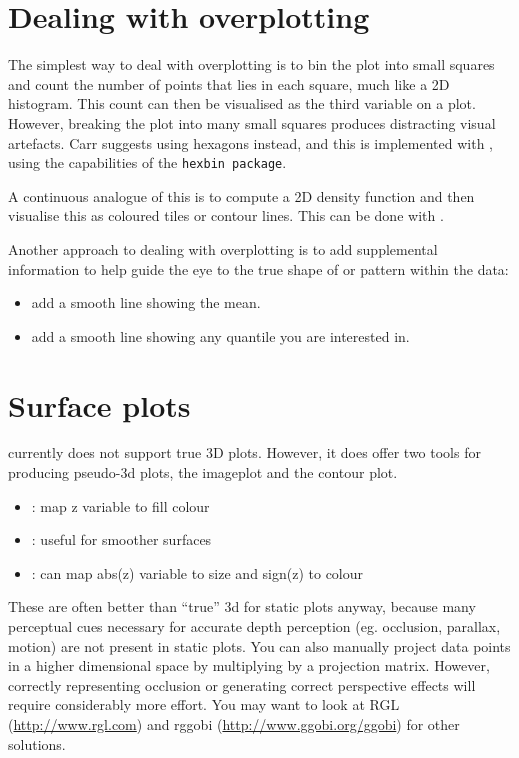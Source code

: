 \section{Dealing with overplotting}
\label{sec:overplotting}

The simplest way to deal with overplotting is to bin the plot into small squares and count the number of points that lies in each square, much like a 2D histogram.  This count can then be visualised as the third variable on a plot.  However, breaking the plot into many small squares produces distracting visual artefacts.  Carr \citep{carr:1987} suggests using hexagons instead, and this is implemented with , using the capabilities of the {\tt hexbin package}.

A continuous analogue of this is to compute a 2D density function and then visualise this as coloured tiles or contour lines.  This can be done with .

Another approach to dealing with overplotting is to add supplemental information to help guide the eye to the true shape of or pattern within the data:

\begin{itemize}
	\item {} add a smooth line showing the mean.
	\item {} add a smooth line showing any quantile you are interested in.
\end{itemize}

\section{Surface plots}
\label{sec:surface}

\ggplot currently does not support true 3D plots.  However, it does offer two tools for producing pseudo-3d plots, the imageplot and the contour plot.

\begin{itemize}
	\item {}: map z variable to fill colour
	\item {}: useful for smoother surfaces
	\item {}: can map abs(z) variable to size and sign(z) to colour
\end{itemize}

These are often better than ``true'' 3d for static plots anyway, because many perceptual cues necessary for accurate depth perception (eg. occlusion, parallax, motion) are not present in static plots.  You can also manually project data points in a higher dimensional space by multiplying by a projection matrix.  However, correctly representing occlusion or generating correct perspective effects will require considerably more effort.  You may want to look at RGL (\url{http://www.rgl.com}) and rggobi (\url{http://www.ggobi.org/ggobi}) for other solutions.

